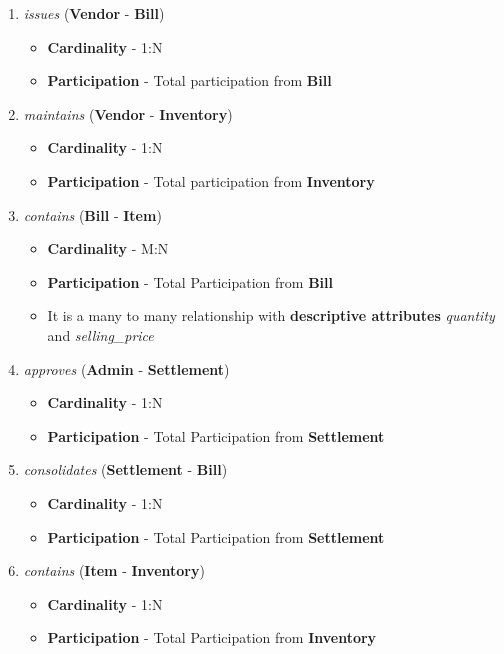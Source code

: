 \documentclass[a4paper,12pt]{article}
\begin{document}
\begin{enumerate}
    \item \textit{issues} (\textbf{Vendor} - \textbf{Bill})
    \begin{itemize}
        \item \textbf{Cardinality} - 1:N
        \item \textbf{Participation} - Total participation from \textbf{Bill}
    \end{itemize}

    \item \textit{maintains} (\textbf{Vendor} - \textbf{Inventory})
    \begin{itemize}
        \item \textbf{Cardinality} - 1:N
        \item \textbf{Participation} - Total participation from \textbf{Inventory}
    \end{itemize}

    \item \textit{contains} (\textbf{Bill} - \textbf{Item})
    \begin{itemize}
        \item \textbf{Cardinality} - M:N
        \item \textbf{Participation} - Total Participation from \textbf{Bill}
        \item It is a many to many relationship with \textbf{descriptive attributes} \textit{quantity}
        and \textit{selling\_price}
    \end{itemize}

    \item \textit{approves} (\textbf{Admin} - \textbf{Settlement})
    \begin{itemize}
        \item \textbf{Cardinality} - 1:N
        \item \textbf{Participation} - Total Participation from \textbf{Settlement}
    \end{itemize}

    \item \textit{consolidates} (\textbf{Settlement} - \textbf{Bill})
    \begin{itemize}
        \item \textbf{Cardinality} - 1:N
        \item \textbf{Participation} - Total Participation from \textbf{Settlement}
    \end{itemize}

    \item \textit{contains} (\textbf{Item} - \textbf{Inventory})
    \begin{itemize}
        \item \textbf{Cardinality} - 1:N
        \item \textbf{Participation} - Total Participation from \textbf{Inventory}
    \end{itemize}
\end{enumerate}
\end{document}
